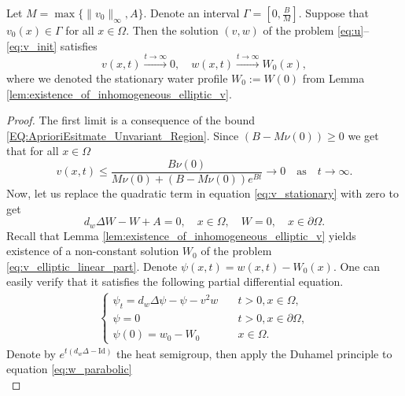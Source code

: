 \documentclass[review,onefignum,onetabnum]{SIAM-styles/siamart171218}
\begin{document}
\begin{thm}
    \label{thm:Exinction-Of-Vegetation}
    Let $M = \max\{\|v_0\|_\infty, A\}$. Denote an interval $\Gamma  = \left[0, \frac{B}{M}\right]$. Suppose that $v_0(x) \in \Gamma$ for all $x \in \Omega$. Then the solution $(v, w)$ of the problem \eqref{eq:u}--\eqref{eq:v_init} satisfies
    \begin{equation}
        v(x,t) \xrightarrow{t \rightarrow \infty} 0, \quad w(x,t) \xrightarrow{t \rightarrow \infty} W_0(x),
    \end{equation}
    where we denoted the stationary water profile $W_0 := W(0)$ from Lemma \ref{lem:existence_of_inhomogeneous_elliptic_v}.
\end{thm}
\begin{proof}
    The first limit is a consequence of the bound \eqref{EQ:AprioriEsitmate_Unvariant_Region}. Since $(B - M\nu(0)) \geq 0$ we get that for all $x \in \Omega$
    \begin{equation*}
        v(x,t) \leq \frac{B\nu(0)}{M \nu(0) + 
        (B - M \nu(0)) e^{B t}} \rightarrow 0 \quad \text{as} \quad t \rightarrow \infty.
    \end{equation*}
    Now, let us replace the quadratic term in equation \eqref{eq:v_stationary} with zero to get
    \begin{equation}
        \label{eq:v_elliptic_linear_part}
        d_w \Delta W - W + A = 0, \quad x \in \Omega, \quad W = 0, \quad x \in \partial \Omega.
    \end{equation}
    Recall that Lemma \ref{lem:existence_of_inhomogeneous_elliptic_v} yields existence of a non-constant solution $W_0$ of the problem \eqref{eq:v_elliptic_linear_part}. Denote $\psi(x,t) = w(x,t) - W_0(x)$. One can easily verify that it satisfies the following partial differential equation.
    \begin{align}
        \label{eq:w_parabolic}
        \begin{cases}
            \psi_t = d_w\Delta \psi - \psi - v^2w &\quad t > 0, x \in \Omega, \\
            \psi = 0 &\quad t > 0, x \in \partial\Omega, \\
            \psi(0) = w_0 - W_0 &\quad x \in \Omega.
        \end{cases}
    \end{align}
    Denote by $e^{t(d_w\Delta - \mathrm{Id})}$ the heat semigroup, then apply the Duhamel principle to equation \eqref{eq:w_parabolic}
    \begin{equation}
        \label{eq:w_duhmel_principle}

\end{equation}
\end{proof}
\end{document}
